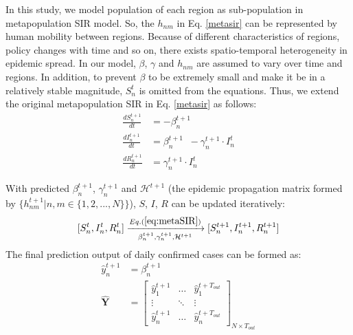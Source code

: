 \documentclass[lettersize,journal]{IEEEtran}
\begin{document}
In this study, we model population of each region as sub-population in metapopulation SIR model. So, the $h_{nm}$ in Eq. \ref{metasir} can be represented by human mobility between regions. Because of different characteristics of regions, policy changes with time and so on, there exists spatio-temporal heterogeneity in epidemic spread. In our model, $\beta$, $\gamma$ and $h_{nm}$ are assumed to vary over time and regions. In addition, to prevent $\beta$ to be extremely small and make it be in a relatively stable magnitude, $S_{n}^t$ is omitted from the equations. Thus, we extend the original metapopulation SIR in Eq. \ref{metasir} as follows:
\begin{equation}\label{eq:metaSIR}
    \begin{aligned}
    \frac{dS_{n}^{t+1}}{dt} & =-\beta_{n}^{t+1}\mathop{\sum_{m=1}^{N}(\frac{h_{mn}^{t+1}}{P_{m}}+\frac{h_{nm}^{t+1}}{P_{n}})I_{m}^t} \\
    \frac{dI_{n}^{t+1}}{dt} & =  \beta_{n}^{t+1}\mathop{\sum_{m=1}^{N}(\frac{h_{mn}^{t+1}}{P_{m}}+\frac{h_{nm}^{t+1}}{P_{n}})I_{m}^t}-\gamma_{n}^{t+1}\cdot I_{n}^t\\
    \frac{dR_{n}^{t+1}}{dt} & =  \gamma_{n}^{t+1}\cdot I_{n}^t
    \end{aligned}
\end{equation}

With predicted $\beta_{n}^{t+1}$, $\gamma_{n}^{t+1}$ and $\mathcal{H}^{t+1}$ (the epidemic propagation matrix formed by $\{h_{nm}^{t+1} | n,m\in\{1,2,...,N\}\}$), $S$, $I$, $R$ can be updated iteratively:
\begin{equation}\label{updateSIR}
[S_{n}^t, I_{n}^t, R_{n}^t] \xrightarrow[\beta_{n}^{t+1}, \gamma_{n}^{t+1}, \mathcal{H}^{t+1}]{Eq. (\ref{eq:metaSIR})} [S_{n}^{t+1}, I_{n}^{t+1}, R_{n}^{t+1}]
\end{equation}
The final prediction output of daily confirmed cases can be formed as:
\begin{equation}\label{finaloutput}
    \begin{aligned}
    {\hat{y}_{n}^{t+1}} &= \beta_{n}^{t+1}\mathop{\sum_{m=1}^{N}(\frac{h_{mn}^{t+1}}{P_{m}}+\frac{h_{nm}^{t+1}}{P_{n}})I_{m}^{t}} \\
    \mathbf{\hat{Y}} &= \begin{bmatrix}
\hat{y}_{1}^{t+1} & \dots & \hat{y}_{1}^{t+T_{out}}\\
\vdots  & \ddots & \vdots\\
\hat{y}_{n}^{t+1} & \dots & \hat{y}_{n}^{t+T_{out}}
\end{bmatrix}_{N \times T_{out}}
    \end{aligned}
\end{equation}
\end{document}
